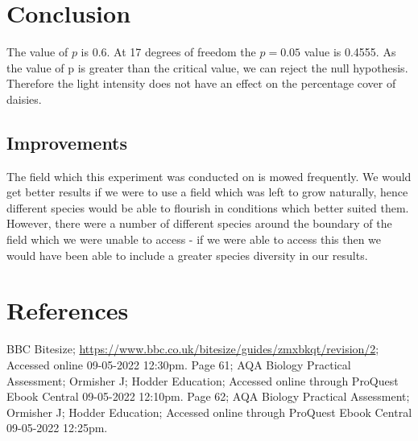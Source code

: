 \documentclass{thomasClass}
\begin{document}
\section{Conclusion}
The value of $p$ is 0.6. At 17 degrees of freedom the $p=0.05$ value is 0.4555. As the value of p is greater than the critical value, we can reject the null hypothesis. Therefore the light intensity does not have an effect on the percentage cover of daisies.

\subsection{Improvements}
The field which this experiment was conducted on is mowed frequently. We would get better results if we were to use a field which was left to grow naturally, hence different species would be able to flourish in conditions which better suited them. However, there were a number of different species around the boundary of the field which we were unable to access - if we were able to access this then we would have been able to include a greater species diversity in our results.


\section{References}
\noindent [1] BBC Bitesize; \href{https://www.bbc.co.uk/bitesize/guides/zmxbkqt/revision/2}{https://www.bbc.co.uk/bitesize/guides/zmxbkqt/revision/2}; Accessed online 09-05-2022 12:30pm. \newline
\noindent [2] Page 61; AQA Biology Practical Assessment; Ormisher J; Hodder Education; Accessed online through ProQuest Ebook Central 09-05-2022 12:10pm. \newline
\noindent [3] Page 62; AQA Biology Practical Assessment; Ormisher J; Hodder Education; Accessed online through ProQuest Ebook Central 09-05-2022 12:25pm.
\end{document}
